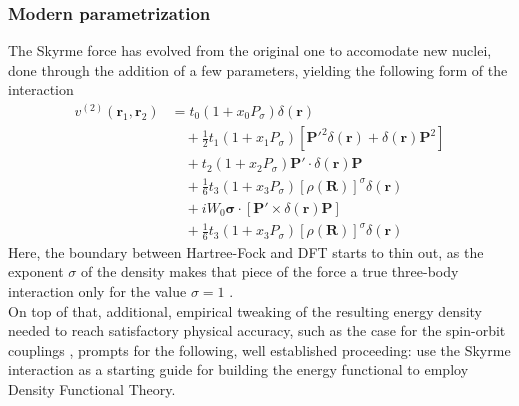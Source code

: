 \subsubsection{Modern parametrization}
The Skyrme force has evolved from the original one to accomodate new nuclei, done through the addition of a few parameters, yielding the following form of the interaction \cite{CHABANAT1997710}
    \begin{align*}
v^{(2)}(\mathbf{r}_1, \mathbf{r}_2) &= t_0 \left(1 + x_0 P_\sigma \right) \delta(\mathbf{r}) \\
&\quad + \frac{1}{2} t_1 \left(1 + x_1 P_\sigma \right) \left[ \mathbf{P}'^2 \delta(\mathbf{r}) + \delta(\mathbf{r}) \mathbf{P}^2 \right] \\
&\quad + t_2 \left(1 + x_2 P_\sigma \right) \mathbf{P}' \cdot \delta(\mathbf{r}) \mathbf{P} \\
&\quad + \frac{1}{6} t_3 \left(1 + x_3 P_\sigma \right) \left[ \rho(\mathbf{R}) \right]^\sigma \delta(\mathbf{r}) \\
&\quad + i W_0 \boldsymbol{\sigma}\cdot \left[ \mathbf{P}' \times \delta(\mathbf{r}) \mathbf{P} \right]\\
&\quad + \frac 1 6 t_3 \left(1 + x_3 P_\sigma \right) \left[ \rho(\mathbf{R}) \right]^\sigma \delta(\mathbf{r}) 
\end{align*}
Here, the boundary between Hartree-Fock and DFT starts to thin out, as the exponent $\sigma$ of the density makes that piece of the force a true three-body interaction only for the value $\sigma=1$ \cite{Erler_2010}.
\\On top of that, additional, empirical tweaking of the resulting energy density needed to reach satisfactory physical accuracy, such as the case for the spin-orbit couplings \cite{REINHARD1995467}, prompts for the following, well established proceeding: use the Skyrme interaction as a starting guide for building the energy functional to employ Density Functional Theory.